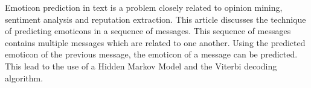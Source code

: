 Emoticon prediction in text is a problem closely related to opinion mining, sentiment analysis and reputation extraction. This article discusses the technique of predicting emoticons in a sequence of messages. This sequence of messages contains multiple messages which are related to one another. Using the predicted emoticon of the previous message, the emoticon of a message can be predicted. This lead to the use of a Hidden Markov Model and the Viterbi decoding algorithm.

\begin{comment}
\red{Refine the abstract, maybe add most important results, a bit too much `lead`} \\
Emoticon prediction in text is a problem closely related to opinion mining, sentiment analysis and reputation extraction. This article discusses two different techniques for predicting emoticons. In the first case, emoticons are predicted based on a single, short message. This lead to the use of an average multiclass perceptron. In the second case, emoticons are predicted, using messages posted in the past. This leads to the previous message also determining the emotion of the message analysed. This lead to the use of a Hidden Markov Model and the Viterbi decoding algorithm.
\end{comment}